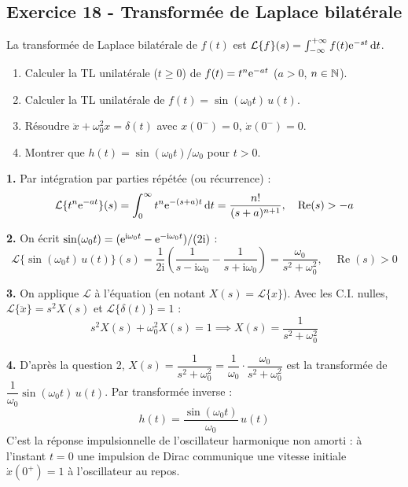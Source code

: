 \documentclass[12pt,a4paper]{article}
\begin{document}
\subsection*{Exercice 18 - Transformée de Laplace bilatérale \niveau{\difficile}}

\begin{boiteexercice}
La transformée de Laplace bilatérale de $f(t)$ est $\mathcal{L}\{f\}(s) = \int_{-\infty}^{+\infty} f(t)\mathrm{e}^{-st}\,\mathrm{d} t$.
\begin{enumerate}
  \item Calculer la TL unilatérale ($t\geq0$) de $f(t)=t^n\mathrm{e}^{-at}$ ($a>0$, $n\in\mathbb{N}$).
  \item Calculer la TL unilatérale de $f(t)=\sin(\omega_0 t)\,u(t)$.
  \item Résoudre $\ddot x + \omega_0^2 x = \delta(t)$ avec $x(0^-)=0$, $\dot x(0^-)=0$.
  \item Montrer que $h(t)=\sin(\omega_0 t)/\omega_0$ pour $t>0$.
\end{enumerate}
\end{boiteexercice}

\begin{boitecorrige}
\textbf{1.} Par intégration par parties répétée (ou récurrence) :
\[
\mathcal{L}\{t^n\mathrm{e}^{-at}\}(s) = \int_0^\infty t^n \mathrm{e}^{-(s+a)t}\,\mathrm{d}t = \frac{n!}{(s+a)^{n+1}}, \quad \operatorname{Re}(s)>-a
\]

\textbf{2.} On écrit $\sin(\omega_0 t)=(\mathrm{e}^{\mathrm{i}\omega_0 t}-\mathrm{e}^{-\mathrm{i}\omega_0 t})/(2\mathrm{i})$ :
\[
\mathcal{L}\{\sin(\omega_0 t)\,u(t)\}(s) = \frac{1}{2\mathrm{i}}\left(\frac{1}{s-\mathrm{i}\omega_0} - \frac{1}{s+\mathrm{i}\omega_0}\right) = \frac{\omega_0}{s^2+\omega_0^2}, \quad \operatorname{Re}(s)>0
\]

\textbf{3.} On applique $\mathcal{L}$ à l'équation (en notant $X(s)=\mathcal{L}\{x\}$). Avec les C.I. nulles, $\mathcal{L}\{\ddot x\}=s^2 X(s)$ et $\mathcal{L}\{\delta(t)\}=1$ :
\[
s^2 X(s) + \omega_0^2 X(s) = 1 \implies X(s) = \frac{1}{s^2+\omega_0^2}
\]

\textbf{4.} D'après la question 2, $X(s) = \dfrac{1}{s^2+\omega_0^2} = \dfrac{1}{\omega_0}\cdot\dfrac{\omega_0}{s^2+\omega_0^2}$
est la transformée de $\dfrac{1}{\omega_0}\sin(\omega_0 t)\,u(t)$. Par transformée inverse :
\[
\boxed{h(t) = \frac{\sin(\omega_0 t)}{\omega_0}\,u(t)}
\]
C'est la réponse impulsionnelle de l'oscillateur harmonique non amorti : à l'instant $t=0$ une impulsion de Dirac communique une vitesse initiale $\dot x(0^+)=1$ à l'oscillateur au repos.
\end{boitecorrige}
\end{document}
